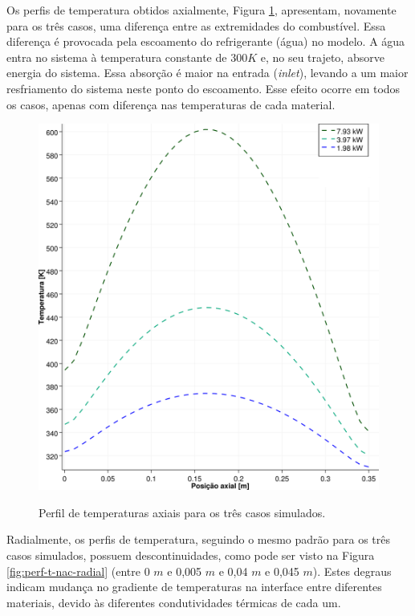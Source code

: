 Os perfis de temperatura obtidos axialmente, Figura \ref{fig:perf-t-nac-axial},
apresentam, novamente para os três casos, uma diferença entre as extremidades
do combustível. Essa diferença é provocada pela escoamento do refrigerante (água) no
modelo. A água entra no sistema à temperatura constante de $300 K$ e, no seu trajeto,
absorve energia do sistema. Essa absorção é maior na entrada (\textit{inlet}),
levando a um maior resfriamento do sistema neste ponto do escoamento. Esse efeito
ocorre em todos os casos, apenas com diferença nas temperaturas de cada material.

\begin{figure}[htb]
  \caption{Perfil de temperaturas axiais para os três casos simulados.}
  \centering\includegraphics[scale=0.5]{figuras/T_z_NC_square_port.png}
\label{fig:perf-t-nac-axial}
\end{figure}

Radialmente, os perfis de temperatura, seguindo o mesmo padrão para os três casos simulados,
possuem descontinuidades, como pode ser visto na Figura \ref{fig:perf-t-nac-radial} (entre
0 $m$ e 0,005 $m$ e 0,04 $m$ e 0,045 $m$). Estes degraus indicam mudança no gradiente de temperaturas na
interface entre diferentes materiais, devido às diferentes condutividades térmicas de cada um.

